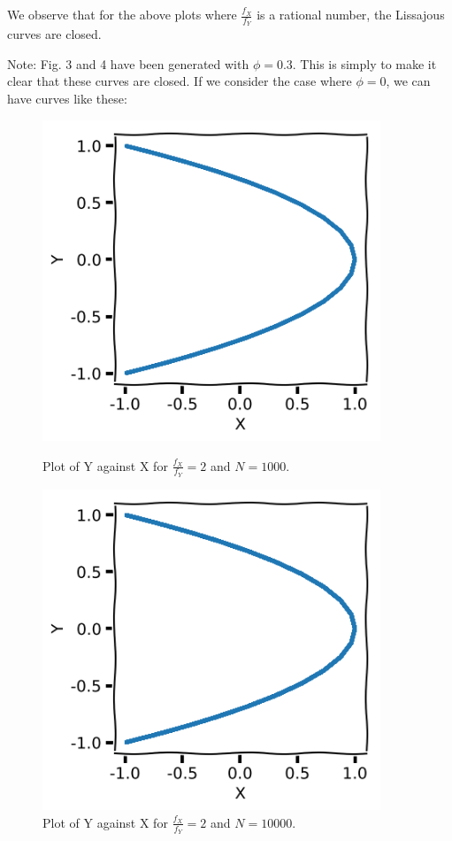 \documentclass[11pt]{article}
\begin{document}
We observe that for the above plots where $\frac{f_X}{f_Y}$ is a rational number, the Lissajous curves are closed. 

Note: Fig. 3 and 4 have been generated with $\phi=0.3$. This is simply to make it clear that these curves are closed. If we consider the case where $\phi=0$, we can have curves like these:
\begin{figure}[htp]
\centering
	\begin{minipage}{0.45\textwidth}
	\centering
	\includegraphics[width=0.9\textwidth]{lissajous_4_2_1_1_0_0.01_1000.png}
	\caption{Plot of Y against X for $\frac{f_X}{f_Y}=2$ and $N=1000$.}
	\label{ratio2_nophi_1000}
	\end{minipage}\hfill	
	\begin{minipage}{0.45\textwidth}
	\centering
	\includegraphics[width=0.9\textwidth]{lissajous_4_2_1_1_0_0.01_10000.png}
	\caption{Plot of Y against X for $\frac{f_X}{f_Y}=2$ and $N=10000$.}
	\label{ratio2_nophi_10000}
	\end{minipage}
\end{figure}
\end{document}
